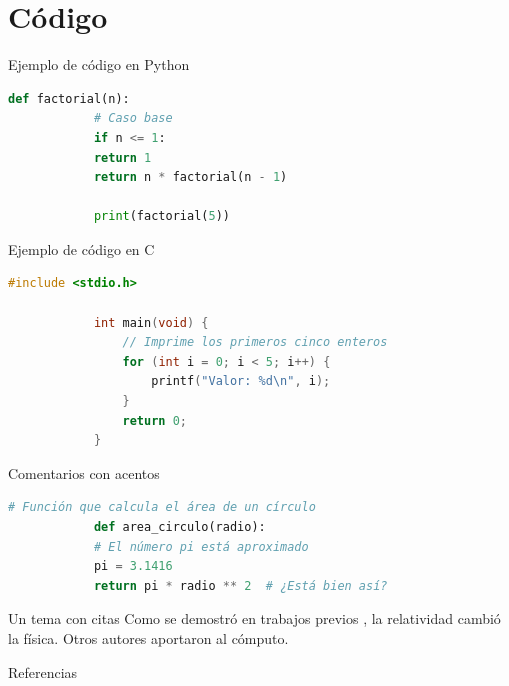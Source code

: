 \documentclass[aspectratio=169]{beamer}
\begin{document}
	\section{Código}
	
	\begin{frame}[fragile]{Ejemplo de código en Python}
		\begin{lstlisting}[language=Python]
			def factorial(n):
			# Caso base
			if n <= 1:
			return 1
			return n * factorial(n - 1)
			
			print(factorial(5))
		\end{lstlisting}
	\end{frame}
	
	\begin{frame}[fragile]{Ejemplo de código en C}
		\begin{lstlisting}[language=C]
			#include <stdio.h>
			
			int main(void) {
				// Imprime los primeros cinco enteros
				for (int i = 0; i < 5; i++) {
					printf("Valor: %d\n", i);
				}
				return 0;
			}
		\end{lstlisting}
	\end{frame}
	
	\begin{frame}[fragile]{Comentarios con acentos }
		\begin{lstlisting}[language=Python]
			# Función que calcula el área de un círculo
			def area_circulo(radio):
			# El número pi está aproximado
			pi = 3.1416
			return pi * radio ** 2  # ¿Está bien así?
		\end{lstlisting}
	\end{frame}
	
	\begin{frame}{Un tema con citas}
		Como se demostró en trabajos previos \cite{einstein1905},
		la relatividad cambió la física. Otros autores
		\cite{knuth1984, lamport1994} aportaron al cómputo.
	\end{frame}
	
	\begin{frame}[allowframebreaks]{Referencias}
		\printbibliography
	\end{frame}
	
\end{document}
